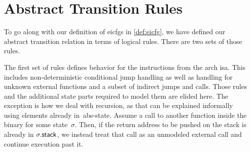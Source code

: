 \section{Abstract Transition Rules}\label{sec:step-function}
To go along with our definition of \acp{eicfg} in \cref{def:eicfg},
we have defined our abstract transition relation in terms of logical rules.
There are two sets of those rules.

The first set of rules defines behavior for the instructions from the \gls{arch} \ac{isa}.
This includes non-deterministic conditional jump handling as well as handling for unknown external functions and a subset of indirect jumps and calls.
Those rules and the additional state parts required to model them are elided here.
The exception is how we deal with recursion, as that can be explained informally using elements already in~\gls{abs-state}.
Assume a call to another function inside the binary for some state~$\sigma$. Then, if the return address to be pushed on the stack is already in $\sigma.\mathsf{stack}$, we instead treat that call as an unmodeled external call and continue execution past it.

